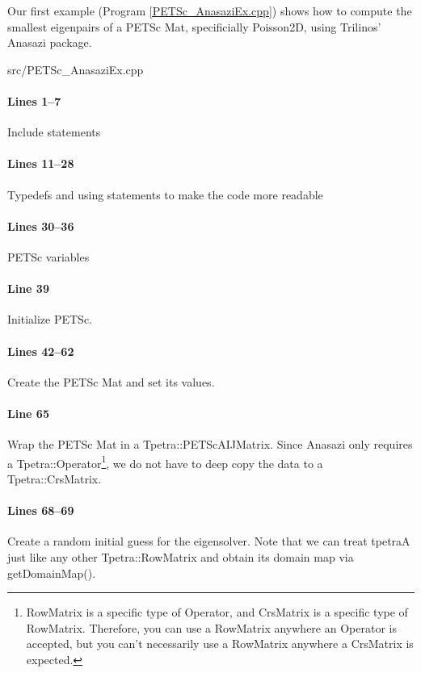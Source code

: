 Our first example (Program \ref{PETSc_AnasaziEx.cpp}) shows how to compute
the smallest eigenpairs of a PETSc Mat, specificially Poisson2D, using Trilinos'
Anasazi package.

\begin{lstinputlisting}[caption=PETSc\_AnasaziEx.cpp,label=PETSc_AnasaziEx.cpp]{src/PETSc_AnasaziEx.cpp}
\end{lstinputlisting}

\paragraph{Lines 1--7}
Include statements

\paragraph{Lines 11--28}
Typedefs and using statements to make the code more readable

\paragraph{Lines 30--36}
PETSc variables

\paragraph{Line 39}
Initialize PETSc.

\paragraph{Lines 42--62}
Create the PETSc Mat and set its values.

\paragraph{Line 65}
Wrap the PETSc Mat in a Tpetra::PETScAIJMatrix.  Since Anasazi only requires a
Tpetra::Operator\footnote{RowMatrix is a specific type of Operator, and
CrsMatrix is a specific type of RowMatrix.  Therefore, you can use a RowMatrix
anywhere an Operator is accepted, but you can't necessarily use a RowMatrix
anywhere a CrsMatrix is expected.}, we do not have to deep copy the data to a
Tpetra::CrsMatrix.

\paragraph{Lines 68--69}
Create a random initial guess for the eigensolver.  Note that we can treat
tpetraA just like any other Tpetra::RowMatrix and obtain its domain map via
getDomainMap().

